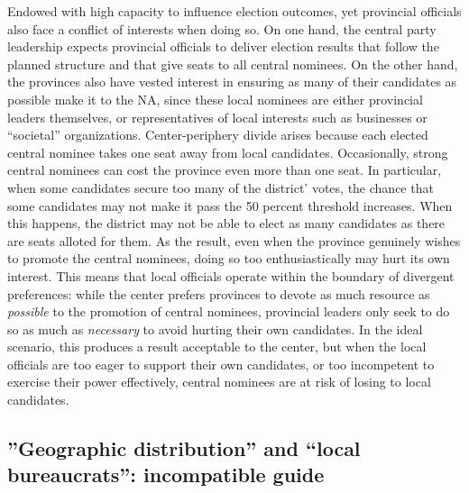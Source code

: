 \documentclass[12pt]{article}\usepackage[]{graphicx}\usepackage[]{color}
\newcommand{\1}{\mathbbm{1}}
\begin{document}
Endowed with high capacity to influence election outcomes, yet provincial officials also face a conflict of interests when doing so. On one hand, the central party leadership expects provincial officials to deliver election results that follow the planned structure and that give seats to all central nominees. On the other hand, the provinces also have vested interest in ensuring as many of their candidates as possible make it to the NA, since these local nominees are either provincial leaders themselves, or representatives of local interests such as businesses or ``societal'' organizations. Center-periphery divide arises because each elected central nominee takes one seat away from local candidates. Occasionally, strong central nominees can cost the province even more than one seat. In particular, when some candidates secure too many of the district' votes, the chance that some candidates may not make it pass the 50 percent threshold increases. When this happens, the district may not be able to elect as many candidates as there are seats alloted for them. As the result, even when the province genuinely wishes to promote the central nominees, doing so too enthusiastically may hurt its own interest. This means that local officials operate within the boundary of divergent preferences: while the center prefers provinces to devote as much resource as \textit{possible} to the promotion of central nominees, provincial leaders only seek to do so as much as \textit{necessary} to avoid hurting their own candidates. In the ideal scenario, this produces a result acceptable to the center, but when the local officials are too eager to support their own candidates, or too incompetent to exercise their power effectively, central nominees are at risk of losing to local candidates.

\subsection{''Geographic distribution'' and ``local bureaucrats'': incompatible guide }
\end{document}
